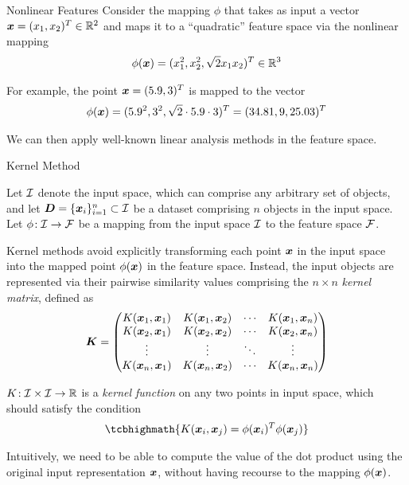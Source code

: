 \begin{frame}{Nonlinear Features}
Consider the mapping $\phi$ that
takes as input a vector ${\boldsymbol x}=(x_1,x_2)^T \in {\mathord{\mathbb R}}^2$ and maps it to a
``quadratic''  feature space via the nonlinear mapping
\begin{align*}
  \phi({\boldsymbol x}) = (x_1^2, x_2^2, \sqrt{2} x_1x_2)^T \in {\mathord{\mathbb R}}^3
\end{align*}

\medskip
For example, the point ${\boldsymbol x} = (5.9,3)^T$ is mapped to the vector
\begin{align*}
  \phi({\boldsymbol x}) = (5.9^2, 3^2, \sqrt{2}\cdot5.9\cdot3)^T = (34.81,9,25.03)^T
\end{align*}

\medskip
We can then apply well-known
linear analysis methods in the feature space. 
\end{frame}


\begin{frame}{Kernel Method}

  \small
Let ${\mathcal I}$ denote the input space, which can
comprise any arbitrary set of objects, and let ${\boldsymbol D} = \{{\boldsymbol x}_i\}_{i=1}^n
\subset {\mathcal I}$ be a dataset comprising $n$ objects in the input space.
Let $\phi\!: {\mathcal I} \to {\mathcal F}$ be a mapping from the
input space ${\mathcal I}$ to the feature space ${\mathcal F}$. 

\medskip
Kernel methods avoid explicitly transforming each point ${\boldsymbol x}$ in the
input space into the mapped point $\phi({\boldsymbol x})$ in the feature space.
Instead, the input objects are represented via their
pairwise similarity values comprising 
the $n \times n$ {\em kernel matrix}, def\/{i}ned as
\begin{align*}
  {\boldsymbol K} = \begin{pmatrix} 
      K({\boldsymbol x}_1,{\boldsymbol x}_1) & K({\boldsymbol x}_1,{\boldsymbol x}_2) & \cdots & K({\boldsymbol x}_1,{\boldsymbol x}_n)\\
      K({\boldsymbol x}_2,{\boldsymbol x}_1) & K({\boldsymbol x}_2,{\boldsymbol x}_2) & \cdots & K({\boldsymbol x}_2,{\boldsymbol x}_n)\\
      \vdots & \vdots & \ddots & \vdots\\
      K({\boldsymbol x}_n,{\boldsymbol x}_1) & K({\boldsymbol x}_n,{\boldsymbol x}_2) & \cdots & K({\boldsymbol x}_n,{\boldsymbol x}_n)\\
     \end{pmatrix}
\end{align*}

\medskip
$K\!: {\mathcal I} \times {\mathcal I} \to {\mathord{\mathbb R}}$
is a {\em kernel function} on any two points in input space, which 
should satisfy the
condition
\begin{align*}
\tcbhighmath{
K(\bx_i, \bx_{j})  = \phi(\bx_i)^T \phi(\bx_{j})
}
\end{align*}

\medskip
Intuitively, we need to
be able to compute the value of the dot product using the
original input representation ${\boldsymbol x}$, without having recourse to the
mapping $\phi({\boldsymbol x})$.  
\end{frame}


